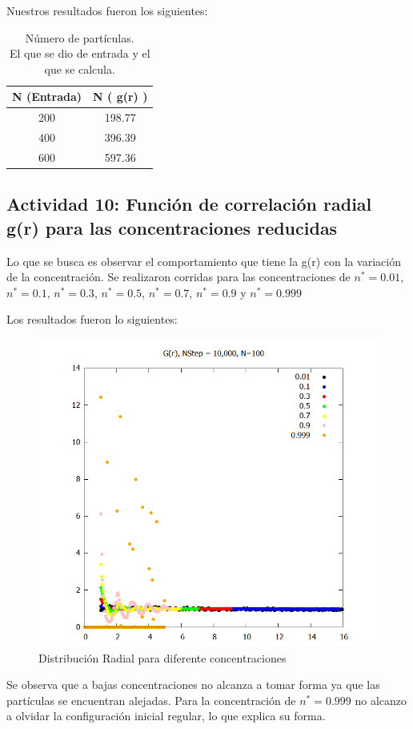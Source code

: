 \documentclass[12pt,letterpaper]{article}
\begin{document}
Nuestros resultados fueron los siguientes:
\begin{table}[H]
	\centering
	\begin{tabular}{|c|c|}
		\hline 
		N (Entrada) & N  ( g(r) ) \\ \hline 
		200 & 198.77 \\ \hline 
		400 & 396.39 \\ \hline 
		600 & 597.36 \\ \hline 
	\end{tabular} 
	\caption{Número de partículas.\\ El que se dio de entrada y el que se calcula.}
	\label{N_Particulas}
\end{table}	

\subsection*{Actividad 10: Función de correlación radial g(r) para las  concentraciones reducidas}	

Lo que se busca es observar el comportamiento que tiene la g(r) con la variación de la concentración. Se realizaron corridas para las concentraciones de $n^* = 0.01$, $n^*=0.1$, $n^*=0.3$, $n^*=0.5$, $n^*=0.7$, $n^*=0.9$ y $n^*=0.999$

Los resultados fueron lo siguientes:
\begin{figure}[H]
	\centering
	\includegraphics[width=0.50\linewidth]{gdrT.png}
	\caption{Distribución Radial para diferente concentraciones}
	\label{GDR_Cons}
\end{figure}
Se observa que a bajas concentraciones no alcanza a tomar forma ya que las partículas se encuentran alejadas. Para la concentración de $n^*=0.999$ no alcanzo a olvidar la configuración inicial regular, lo que explica su forma.
\end{document}
